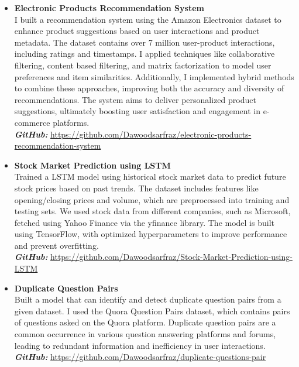 \documentclass[a4paper,12pt]{article}
\begin{document}
\begin{itemize}
	
\item \textbf{Electronic Products Recommendation System} \\
I built a recommendation system using the Amazon Electronics dataset to enhance product suggestions based on user interactions and product metadata. The dataset contains over 7 million user-product interactions, including ratings and timestamps. I applied techniques like collaborative filtering, content based filtering, and matrix factorization to model user preferences and item similarities. Additionally, I implemented hybrid methods to combine these approaches, improving both the accuracy and diversity of recommendations. The system aims to deliver personalized product suggestions, ultimately boosting user satisfaction and engagement in e-commerce platforms. \\
\textbf{\textit{GitHub:}} \href{https://github.com/Dawoodsarfraz/electronic-products-recommendation-system}{https://github.com/Dawoodsarfraz/electronic-products-recommendation-system}


\item \textbf{Stock Market Prediction using LSTM} \\
Trained a LSTM model using historical stock market data to predict future stock prices based on past trends. The dataset includes features like opening/closing prices and volume, which are preprocessed into training and testing sets. We used stock data from different companies, such as Microsoft, fetched using Yahoo Finance via the yfinance library. The model is built using TensorFlow, with optimized hyperparameters to improve performance and prevent overfitting. \\
\textbf{\textit{GitHub:}} \href{https://github.com/Dawoodsarfraz/Stock-Market-Prediction-using-LSTM}{https://github.com/Dawoodsarfraz/Stock-Market-Prediction-using-LSTM}

\newpage
\item \textbf{Duplicate Question Pairs} \\
Built a model that can identify and detect duplicate question pairs from a given dataset. I used the Quora Question Pairs dataset, which contains pairs of questions asked on the Quora platform. Duplicate question pairs are a common occurrence in various question answering platforms and forums, leading to redundant information and inefficiency in user interactions. \\
\textbf{\textit{GitHub:}} 
\href{https://github.com/Dawoodsarfraz/duplicate-questions-pair}{https://github.com/Dawoodsarfraz/duplicate-questions-pair}



\end{itemize}
\end{document}
